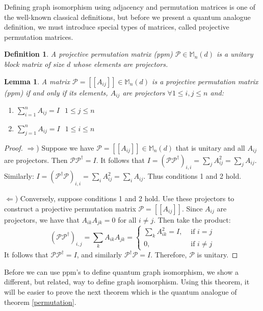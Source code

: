 \documentclass[12pt]{article}
\newtheorem{lem}[thm]{Lemma}
\newtheorem{defn}[thm]{Definition}
\begin{document}
Defining graph isomorphism using adjacency and permutation matrices is one of the well-known classical definitions, but before we present a quantum analogue definition, we must introduce special types of matrices, called projective permutation matrices.

\begin{defn}
A projective permutation matrix (ppm) $\mathcal{P} \in \mathbb{M}_n(d)$ is a unitary block matrix of size $d$ whose elements are projectors.
\end{defn}

\begin{lem} \label{ppm}
A matrix $\mathcal{P} = [[A_{ij}]] \in \mathbb{M}_n(d)$ is a projective permutation matrix (ppm) if and only if its elements, $A_{ij}$ are projectors $\forall 1 \leq i, j \leq n$ and:
\begin{enumerate}
\item $\sum_{i=1}^n A_{ij} = I$ $ $ $1 \leq j \leq n$
\item $\sum_{j=1}^n A_{ij} = I$ $ $ $1 \leq i \leq n$
\end{enumerate}
\end{lem}
\begin{proof}
$\Rightarrow$) Suppose we have $\mathcal{P} = [[A_{ij}]] \in \mathbb{M}_n(d)$ that is unitary and all $A_{ij}$ are projectors. Then $\mathcal{P} \mathcal{P}^{\dag} = I$. It follows that $I = (\mathcal{P} \mathcal{P}^{\dag})_{i, i} = \sum_j A_{ij}^2 = \sum_j A_{ij}$. Similarly: $I = (\mathcal{P}^{\dag} \mathcal{P})_{i, i} = \sum_i A_{ij}^2 = \sum_i A_{ij}$. Thus conditions 1 and 2 hold.

$\Leftarrow$) Conversely, suppose conditions 1 and 2 hold. Use these projectors to construct a projective permutation matrix $\mathcal{P} = [[A_{ij}]]$. Since $A_{ij}$ are projectors, we have that $A_{ik}A_{jk} = 0$ for all $i \neq j$. Then take the product: 
\[ (\mathcal{P}\mathcal{P}^{\dag})_{i,j} = \sum_k A_{ik}A_{jk} = \begin{cases} 
\sum_k A_{ik}^2 = I, & \text{ if } i = j \\
0, & \text{ if } i \neq j  \end{cases}
\]
It follows that $\mathcal{P}\mathcal{P}^{\dag} = I$, and similarly $\mathcal{P}^{\dag} \mathcal{P} = I$. Therefore, $\mathcal{P}$ is unitary.
\end{proof}

Before we can use ppm's to define quantum graph isomorphism, we show a different, but related, way to define graph isomorphism. Using this theorem, it will be easier to prove the next theorem which is the quantum analogue of theorem \ref{permutation}.
\end{document}
